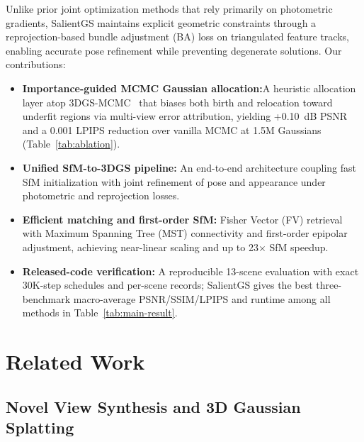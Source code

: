 \documentclass[sigconf]{acmart}
\begin{document}
Unlike prior joint optimization methods that rely primarily on photometric gradients, SalientGS maintains explicit geometric constraints through a reprojection-based bundle adjustment (BA) loss on triangulated feature tracks, enabling accurate pose refinement while preventing degenerate solutions.
Our contributions:
{\setlength{\topsep}{2pt}
\setlength{\itemsep}{2pt}
\setlength{\parsep}{0pt}
\setlength{\partopsep}{0pt}
\begin{itemize}
    \item \textbf{Importance-guided MCMC Gaussian allocation:}\newline A heuristic allocation layer atop 3DGS-MCMC~\cite{mcmc3dgs} that biases both birth and relocation toward underfit regions via multi-view error attribution, yielding +0.10~dB PSNR and a 0.001 LPIPS reduction over vanilla MCMC at 1.5M Gaussians (Table~\ref{tab:ablation}).
    \item \textbf{Unified SfM-to-3DGS pipeline:} An end-to-end architecture coupling fast SfM initialization with joint refinement of pose and appearance under photometric and reprojection losses.
    \item \textbf{Efficient matching and first-order SfM:} Fisher Vector (FV) retrieval with Maximum Spanning Tree (MST) connectivity and first-order epipolar adjustment, achieving near-linear scaling and up to 23$\times$ SfM speedup.
    \item \textbf{Released-code verification:} A reproducible 13-scene evaluation with exact 30K-step schedules and per-scene records; SalientGS gives the best three-benchmark macro-average PSNR/SSIM/LPIPS and runtime among all methods in Table~\ref{tab:main-result}.
\end{itemize}
}

\section{Related Work}
\label{sec:related_work}

\subsection{Novel View Synthesis and 3D Gaussian Splatting}
\end{document}
